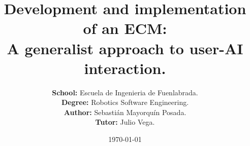 
\title{
    \large\bfseries Development and implementation of an ECM: \\ 
    \textnormal{A generalist approach to user-AI interaction.}
}
\author{%
  \textbf{School:} Escuela de Ingenieria de Fuenlabrada. \\
  \textbf{Degree:} Robotics Software Engineering. \\[8cm]
  \Large\textbf{Author:} Sebastián Mayorquín Posada.\\
  \Large\textbf{Tutor:} Julio Vega.
}

\posttitle{%
  \par
  \vspace{-10pt}
  \rule{\linewidth}{1pt}
  \end{center}

  \vspace{-20pt}
}

\date{\Large{\today}}
\maketitle